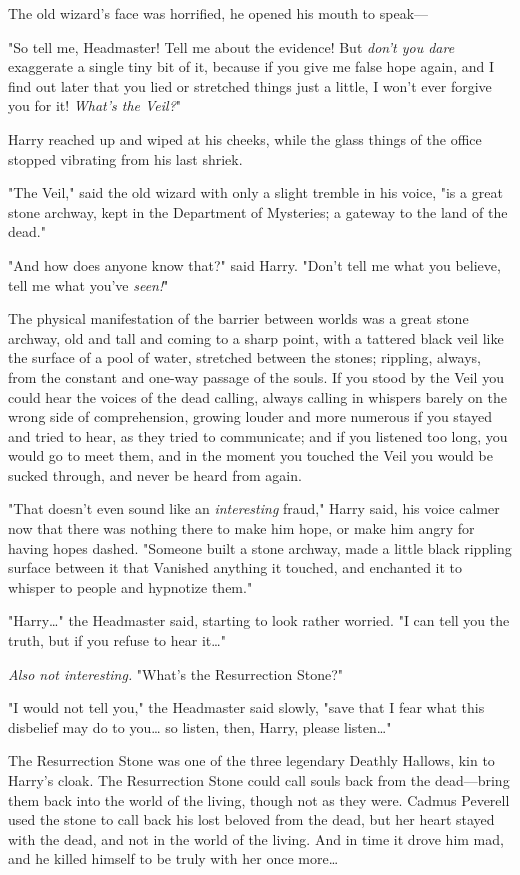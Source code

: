 The old wizard's face was horrified, he opened his mouth to speak---

"So tell me, Headmaster! Tell me about the evidence! But \emph{don't you dare}
exaggerate a single tiny bit of it, because if you give me false hope again,
and I find out later that you lied or stretched things just a little, I won't
ever forgive you for it! \emph{What's the Veil?}"

Harry reached up and wiped at his cheeks, while the glass things of the office
stopped vibrating from his last shriek.

"The Veil," said the old wizard with only a slight tremble in his voice, "is a
great stone archway, kept in the Department of Mysteries; a gateway to the land
of the dead."

"And how does anyone know that?" said Harry. "Don't tell me what you believe,
tell me what you've \emph{seen!}"

The physical manifestation of the barrier between worlds was a great stone
archway, old and tall and coming to a sharp point, with a tattered black veil
like the surface of a pool of water, stretched between the stones; rippling,
always, from the constant and one-way passage of the souls. If you stood by the
Veil you could hear the voices of the dead calling, always calling in whispers
barely on the wrong side of comprehension, growing louder and more numerous if
you stayed and tried to hear, as they tried to communicate; and if you listened
too long, you would go to meet them, and in the moment you touched the Veil you
would be sucked through, and never be heard from again.

"That doesn't even sound like an \emph{interesting} fraud," Harry said, his
voice calmer now that there was nothing there to make him hope, or make him
angry for having hopes dashed. "Someone built a stone archway, made a little
black rippling surface between it that Vanished anything it touched, and
enchanted it to whisper to people and hypnotize them."

"Harry{\ldots}" the Headmaster said, starting to look rather worried. "I can
tell you the truth, but if you refuse to hear it{\ldots}"

\emph{Also not interesting.}  "What's the Resurrection Stone?"

"I would not tell you," the Headmaster said slowly, "save that I fear what this
disbelief may do to you{\ldots} so listen, then, Harry, please listen{\ldots}"

The Resurrection Stone was one of the three legendary Deathly Hallows, kin to
Harry's cloak. The Resurrection Stone could call souls back from the
dead---bring them back into the world of the living, though not as they were.
Cadmus Peverell used the stone to call back his lost beloved from the dead, but
her heart stayed with the dead, and not in the world of the living. And in time
it drove him mad, and he killed himself to be truly with her once more{\ldots}

